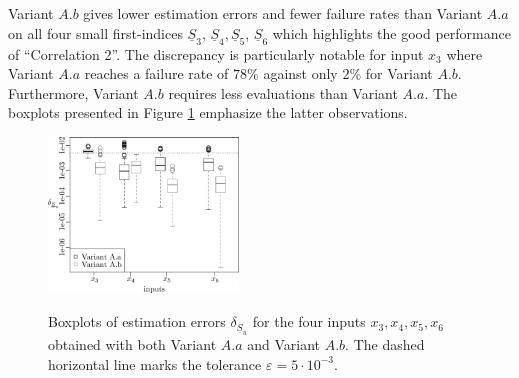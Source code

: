Variant $A.b$ gives lower estimation errors and fewer failure rates than Variant $A.a$ on all four small first-indices $\underline{S}_3$, $\underline{S}_4,\underline{S}_5$, $\underline{S}_6$ which highlights the good performance of ``Correlation 2''. The discrepancy is particularly notable for input $x_3$ where Variant $A.a$ reaches a failure rate of $78\%$ against only $2\%$ for Variant $A.b$. Furthermore, Variant $A.b$ requires less evaluations than Variant $A.a$. The boxplots presented in Figure \ref{boxplots.bratley} emphasize the latter observations.
\begin{figure}[t]
\caption{Boxplots of estimation errors $\delta_{\underline{S}_u}$ for the four inputs $x_3,x_4,x_5,x_6$ obtained with both Variant $A.a$ and Variant $A.b$. The dashed horizontal line marks the tolerance $\varepsilon=5\cdot 10^{-3}$.}
\vspace*{0.2cm}
\centering
\includegraphics[width=0.45\textwidth]{bratley_box.eps}
\label{boxplots.bratley}
\end{figure}

